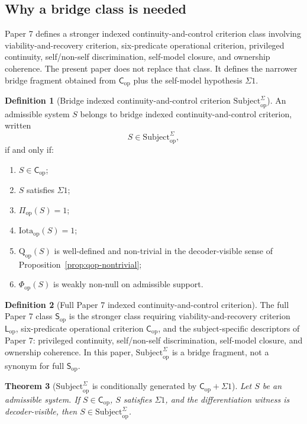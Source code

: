 \documentclass[11pt,a4paper]{article}
\newtheorem{theorem}{Theorem}[section]
\theoremstyle{definition}
\newtheorem{definition}[theorem]{Definition}
\newcommand{\Cop}{\mathsf{C}_{\mathrm{op}}}
\newcommand{\Subop}{\mathsf{S}_{\mathrm{op}}}
\newcommand{\Subbridge}{\mathrm{Subject}^{\Sigma}_{\mathrm{op}}}
\newcommand{\Lop}{\mathsf{L}_{\mathrm{op}}}
\newcommand{\Qop}{\mathrm{Q}_{\mathrm{op}}}
\newcommand{\Piop}{\Pi_{\mathrm{op}}}
\newcommand{\Iotaop}{\mathrm{Iota}_{\mathrm{op}}}
\newcommand{\Phiop}{\Phi_{\mathrm{op}}}
\begin{document}
\subsection{Why a bridge class is needed}
Paper 7 defines a stronger indexed continuity-and-control criterion class involving viability-and-recovery criterion, six-predicate operational criterion, privileged continuity, self/non-self discrimination, self-model closure, and ownership coherence. The present paper does not replace that class. It defines the narrower bridge fragment obtained from $\Cop$ plus the self-model hypothesis $\Sigma1$.

\begin{definition}[Bridge indexed continuity-and-control criterion $\Subbridge$]\label{def:subbridge}
An admissible system $S$ belongs to bridge indexed continuity-and-control criterion, written
\[
S\in\Subbridge,
\]
if and only if:
\begin{enumerate}[leftmargin=1.5em]
\item $S\in\Cop$;
\item $S$ satisfies $\Sigma1$;
\item $\Piop(S)=1$;
\item $\Iotaop(S)=1$;
\item $\Qop(S)$ is well-defined and non-trivial in the decoder-visible sense of Proposition~\ref{prop:qop-nontrivial};
\item $\Phiop(S)$ is weakly non-null on admissible support.
\end{enumerate}
\end{definition}

\begin{definition}[Full Paper 7 indexed continuity-and-control criterion]\label{def:full-paper7-subjecthood}
The full Paper 7 class $\Subop$ is the stronger class requiring viability-and-recovery criterion $\Lop$, six-predicate operational criterion $\Cop$, and the subject-specific descriptors of Paper 7: privileged continuity, self/non-self discrimination, self-model closure, and ownership coherence. In this paper, $\Subbridge$ is a bridge fragment, not a synonym for full $\Subop$.
\end{definition}

\begin{theorem}[$\Subbridge$ is conditionally generated by $\Cop+\Sigma1$]\label{thm:subbridge-generated}
Let $S$ be an admissible system. If $S\in\Cop$, $S$ satisfies $\Sigma1$, and the differentiation witness is decoder-visible, then $S\in\Subbridge$.
\end{theorem}
\end{document}
